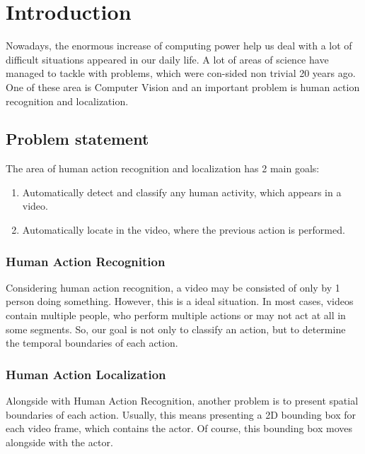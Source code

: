 



% 

\chapter{Introduction}
Nowadays, the enormous increase of computing power help us deal with a lot of difficult situations appeared in our daily life.
A lot of areas of science have managed to tackle with problems, which were con-sided non trivial 20 years ago. One of
these area is Computer Vision and an important problem is human action recognition and localization.
\section{Problem statement}
The area of human action recognition and localization has 2 main goals:
\begin{enumerate}
\item Automatically detect and classify any human activity, which appears in a video.
\item Automatically locate in the video, where the previous action is performed.
\end{enumerate}

\subsection{Human Action Recognition}
Considering human action recognition, a video may be consisted of only by 1 person doing something. However, this is a ideal
situation. In most cases, videos contain multiple people, who perform multiple actions or may not act at all in some segments.
So, our goal is not only to classify an action, but to determine the temporal boundaries of each action.
\subsection{Human Action Localization}
Alongside with Human Action Recognition, another problem is to present spatial boundaries of each action. Usually, this means
presenting a 2D bounding box for each video frame, which contains the actor. Of course, this bounding box moves alongside with
the actor.

